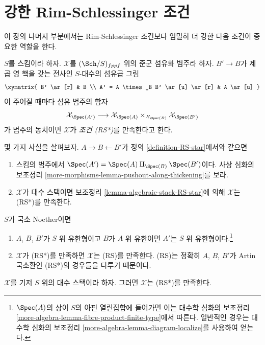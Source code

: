 \section{강한 Rim-Schlessinger 조건}
\label{section-RS-star}

\noindent
이 장의 나머지 부분에서는 Rim-Schlessinger 조건보다 엄밀히 더 강한
다음 조건이 중요한 역할을 한다.

\begin{definition}
\label{definition-RS-star}
$S$를 스킴이라 하자. $\mathcal{X}$를 $(\Sch/S)_{fppf}$ 위의 준군
섬유화 범주라 하자. $B' \to B$가 제곱 영 핵을 갖는 전사인
$S$-대수의 섬유곱 그림
$$
\xymatrix{
B' \ar[r] & B \\
A' = A \times_B B' \ar[u] \ar[r] & A \ar[u]
}
$$
이 주어질 때마다 섬유 범주의 함자
$$
\mathcal{X}_{\Spec(A')}
\longrightarrow
\mathcal{X}_{\Spec(A)} \times_{\mathcal{X}_{\Spec(B)}} \mathcal{X}_{\Spec(B')}
$$
가 범주의 동치이면 $\mathcal{X}$가 {\it 조건 (RS*)}를 만족한다고 한다.
\end{definition}

\noindent
몇 가지 사실을 살펴보자.
$A \to B \leftarrow B'$가 정의 \ref{definition-RS-star}에서와 같으면
\begin{enumerate}
\item 스킴의 범주에서 $\Spec(A') = \Spec(A) \amalg_{\Spec(B)} \Spec(B')$이다.
사상 심화의 보조정리 \ref{more-morphisms-lemma-pushout-along-thickening}를 보라.
\item $\mathcal{X}$가 대수 스택이면 보조정리
\ref{lemma-algebraic-stack-RS-star}에 의해 $\mathcal{X}$는 (RS*)를 만족한다.
\end{enumerate}
$S$가 국소 Noether이면
\begin{enumerate}
\item[(3)] $A$, $B$, $B'$가 $S$ 위 유한형이고 $B$가 $A$ 위 유한이면
$A'$는 $S$ 위 유한형이다.\footnote{$\Spec(A)$의 상이 $S$의 아핀 열린집합에
들어가면 이는 대수학 심화의 보조정리
\ref{more-algebra-lemma-fibre-product-finite-type}에서 따른다.
일반적인 경우는 대수학 심화의 보조정리
\ref{more-algebra-lemma-diagram-localize}를 사용하여 얻는다.}
\item[(4)] $\mathcal{X}$가 (RS*)를 만족하면 $\mathcal{X}$는 (RS)를
만족한다. (RS)는 정확히 $A$, $B$, $B'$가 Artin 국소환인 (RS*)의
경우들을 다루기 때문이다.
\end{enumerate}

\begin{lemma}
\label{lemma-algebraic-stack-RS-star}
$\mathcal{X}$를 기저 $S$ 위의 대수 스택이라 하자.
그러면 $\mathcal{X}$는 (RS*)를 만족한다.
\end{lemma}

